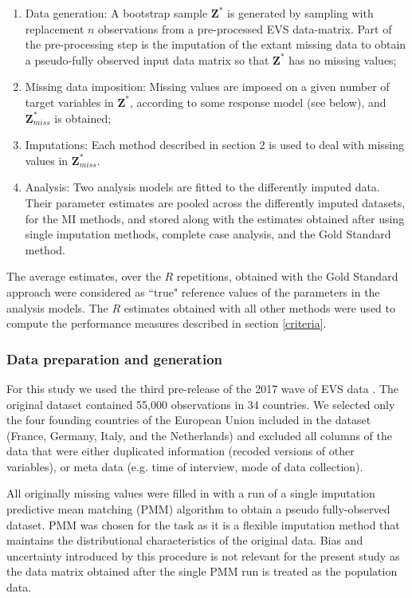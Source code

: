\begin{enumerate}
	\item Data generation: A bootstrap sample $\bm{Z}^{*}$ is generated by sampling with replacement $n$ 
		observations from a pre-processed EVS data-matrix. 
		Part of the pre-processing step is the imputation of the extant missing data to obtain a pseudo-fully 
		observed input data matrix so that $\bm{Z}^{*}$ has no missing values;
	\item Missing data imposition: Missing values are imposed on a given number of target variables
		in $\bm{Z}^{*}$, according to some response model (see below), and $\bm{Z}^{*}_{miss}$ is 
		obtained;
	\item Imputations: Each method described in section 2 is used to deal with missing values
		in $\bm{Z}^{*}_{miss}$.
	\item Analysis: Two analysis models are fitted to the differently imputed data.
		Their parameter estimates are pooled across the differently imputed datasets, for the MI methods, 
		and stored along with the estimates obtained after using single imputation methods, complete case 
		analysis, and the Gold Standard method.
\end{enumerate}

	The average estimates, over the $R$ repetitions, obtained with the Gold Standard approach were considered 
	as ``true" reference values of the parameters in the analysis models.
	The $R$ estimates obtained with all other methods were used to compute the performance measures described 
	in section \ref{criteria}.

\subsubsection{Data preparation and generation}
	For this study we used the third pre-release of the 2017 wave of EVS data \citep{EVS:2017}.
	The original dataset contained 55,000 observations in 34 countries.
	We selected only the four founding countries of the European Union included in the dataset (France, Germany,
	Italy, and the Netherlands) and excluded all columns of the data that were either duplicated
	information (recoded versions of other variables), or meta data (e.g. time of interview,
	mode of data collection). 

	All originally missing values were filled in with a run of a single imputation predictive mean matching (PMM) 
	algorithm to obtain a pseudo fully-observed dataset.
	PMM was chosen for the task as it is a flexible imputation method that maintains the distributional 
	characteristics of the original data.
	Bias and uncertainty introduced by this procedure is not relevant for the present study as the data matrix
	obtained after the single PMM run is treated as the population data.
	
